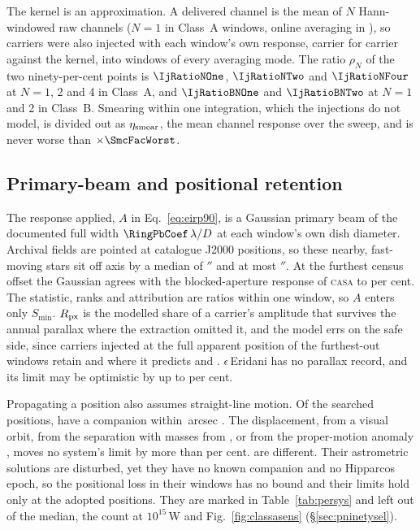 The kernel is an approximation. A delivered channel is the mean of $N$
Hann-windowed raw channels ($N=1$ in \SvNWinNOne{} Class~A windows, online
averaging in \SvNWinNAvg), so carriers were also injected with each window's
own response, carrier for carrier against the kernel, into \IjNWin{} windows
of every averaging mode. The ratio $\rho_N$ of the two ninety-per-cent points
is $\IjRatioNOne$, $\IjRatioNTwo$ and $\IjRatioNFour$ at $N=1$, 2 and 4 in
Class~A, and $\IjRatioBNOne$ and $\IjRatioBNTwo$ at $N=1$ and 2 in Class~B.
Smearing within one integration, which the injections do not model, is
divided out as $\eta_{\rm smear}$, the mean channel response over the sweep,
and is never worse than $\times\SmcFacWorst$.

\subsection{Primary-beam and positional retention}
\label{app:pbresp}

The response applied, $A$ in Eq.~\ref{eq:eirp90}, is a Gaussian primary beam
of the documented full width $\RingPbCoef\,\lambda/D$ \citep{ALMAHandbook}
at each window's own dish diameter. Archival fields are pointed at catalogue
J2000 positions, so these nearby, fast-moving stars sit off axis by a median
of \PbOffMed$''$ and at most \BmOffMax$''$. At the furthest census offset the
Gaussian agrees with the blocked-aperture response of \textsc{casa}
\citep{CASA2022} to \BmCensusWorstPct{} per cent. The statistic, ranks and
attribution are ratios within one window, so $A$ enters only $S_{\min}$.
$R_{\rm px}$ is the modelled share of a carrier's amplitude that survives the
annual parallax where the extraction omitted it, and the model errs on the
safe side, since carriers injected at the full apparent position of the
\SensNReextWin{} furthest-out windows retain \SensPxSmallMeas{} and
\SensPxLargeMeas{} where it predicts \SensPxSmallPred{} and
\SensPxLargePred. $\epsilon$\,Eridani has no parallax record, and its limit
may be optimistic by up to \BmEpsPxBoundPct{} per cent.

Propagating a position also assumes straight-line motion. Of the
\OmNStar{} searched positions, \OmNComponent{} have a companion within
\OmRadius\,arcsec \citep{wds,orb6}. The displacement, from a visual orbit,
from the separation with masses from \citet{pecaut2013}, or from the
proper-motion anomaly \citep{kervella2022}, moves no system's limit by more
than \OmSysMovedMaxPct{} per cent. \OmFlagStars{} are different. Their
astrometric solutions are disturbed, yet they have no known companion and no
Hipparcos epoch, so the positional loss in their \OmNWinFlag{} windows has no
bound and their limits hold only at the adopted positions. They are marked
in Table~\ref{tab:persys} and left out of the median, the count at
$10^{15}$\,W and Fig.~\ref{fig:classasens} (\S\ref{sec:pninetysel}).

